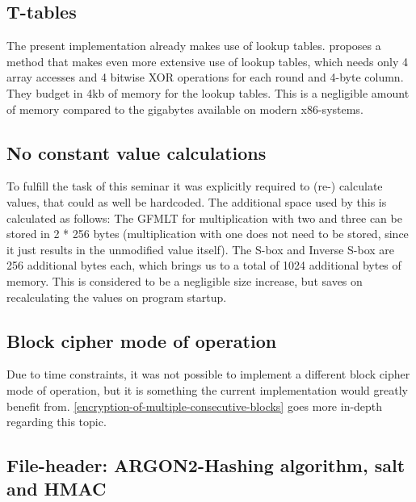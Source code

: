 \hypertarget{t-tables}{%
\subsection{T-tables}\label{t-tables}}

The present implementation already makes use of lookup tables. \cite[p. 59]{rijndael} proposes a method that makes even more extensive use of lookup
tables, which needs only 4 array accesses and 4 bitwise XOR operations
for each round and 4-byte column. They budget in 4kb of memory for the
lookup tables. This is a negligible amount of memory compared to the
gigabytes available on modern x86-systems.

\hypertarget{no-constant-value-calculations}{%
\subsection{No constant value
calculations}\label{no-constant-value-calculations}}

To fulfill the task of this seminar it was explicitly required to (re-)
calculate values, that could as well be hardcoded. The additional space
used by this is calculated as follows: The GFMLT for multiplication with
two and three can be stored in 2 * 256 bytes (multiplication with one
does not need to be stored, since it just results in the unmodified
value itself). The S-box and Inverse S-box are 256 additional bytes
each, which brings us to a total of 1024 additional bytes of memory.
This is considered to be a negligible size increase, but saves on
recalculating the values on program startup.

\hypertarget{block-cipher-mode-of-operation}{%
\subsection{Block cipher mode of
operation}\label{block-cipher-mode-of-operation}}

Due to time constraints, it was not possible to implement a different
block cipher mode of operation, but it is something the current
implementation would greatly benefit from. \ref{encryption-of-multiple-consecutive-blocks} goes more
in-depth regarding this topic.

\hypertarget{file-header-argon2-hashing-algorithm-salt-and-hmac}{%
\subsection{File-header: ARGON2-Hashing algorithm, salt and
HMAC}\label{file-header-argon2-hashing-algorithm-salt-and-hmac}}

